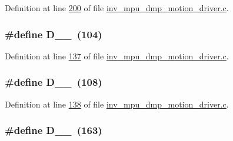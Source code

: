Definition at line \hyperlink{inv__mpu__dmp__motion__driver_8c_source_l00200}{200} of file \hyperlink{inv__mpu__dmp__motion__driver_8c_source}{inv\+\_\+mpu\+\_\+dmp\+\_\+motion\+\_\+driver.\+c}.

\subsubsection[{\texorpdfstring{D\+\_\+0\+\_\+104}{D_0_104}}]{\setlength{\rightskip}{0pt plus 5cm}\#define D\+\_\+\_~(104)}\hypertarget{group___d_r_i_v_e_r_s_ga5edbce4fdd515aa31a227fb8eaf0151f}{}\label{group___d_r_i_v_e_r_s_ga5edbce4fdd515aa31a227fb8eaf0151f}


Definition at line \hyperlink{inv__mpu__dmp__motion__driver_8c_source_l00137}{137} of file \hyperlink{inv__mpu__dmp__motion__driver_8c_source}{inv\+\_\+mpu\+\_\+dmp\+\_\+motion\+\_\+driver.\+c}.

\subsubsection[{\texorpdfstring{D\+\_\+0\+\_\+108}{D_0_108}}]{\setlength{\rightskip}{0pt plus 5cm}\#define D\+\_\+\_~(108)}\hypertarget{group___d_r_i_v_e_r_s_gabbbb1d6730f23abc1e951d7741fa24d5}{}\label{group___d_r_i_v_e_r_s_gabbbb1d6730f23abc1e951d7741fa24d5}


Definition at line \hyperlink{inv__mpu__dmp__motion__driver_8c_source_l00138}{138} of file \hyperlink{inv__mpu__dmp__motion__driver_8c_source}{inv\+\_\+mpu\+\_\+dmp\+\_\+motion\+\_\+driver.\+c}.

\subsubsection[{\texorpdfstring{D\+\_\+0\+\_\+163}{D_0_163}}]{\setlength{\rightskip}{0pt plus 5cm}\#define D\+\_\+\_~(163)}\hypertarget{group___d_r_i_v_e_r_s_ga4d6d669548fe77f07062baf9e452fb06}{}\label{group___d_r_i_v_e_r_s_ga4d6d669548fe77f07062baf9e452fb06}


